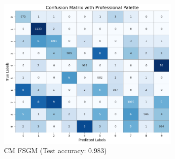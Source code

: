 \documentclass[11pt,onside]{article}
\begin{document}
\begin{algorithm}[H]
\begin{algorithmic}[1]
\end{algorithmic}
\end{algorithm}



\begin{figure}[h]
\centering
\includegraphics[width=0.8\textwidth]{V2_images/model.png}
\caption{CM FSGM (Test accuracy: 0.983) }
\label{fig:FSGM}
\end{figure}
\end{document}
